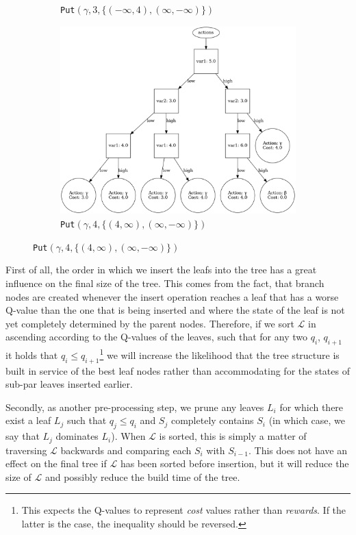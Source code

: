 \documentclass{article}
\begin{document}
\begin{figure}[H]
\begin{subfigure}[t]{0.55\textwidth}
        \captionsetup{labelformat=empty}
        \caption{%
            \texttt{Put}$(\gamma, 3, \{(-\infty, 4),(\infty,-\infty)\})$
        }
    \end{subfigure}
    \begin{subfigure}[t]{0.55\textwidth}
        \centering
        \includegraphics[width=.9\textwidth]{exampleBuild6}
        \captionsetup{labelformat=empty}
        \caption{%
            \texttt{Put}$(\gamma, 4, \{(4, \infty),(\infty,-\infty)\})$
        }
    \end{subfigure}
\end{figure}

First of all, the order in which we insert the leafs into the tree has a great
influence on the final size of the tree. This comes from the fact, that branch
nodes are created whenever the insert operation reaches a leaf that has a worse
Q-value than the one that is being inserted and where the state of the leaf is
not yet completely determined by the parent nodes. Therefore, if we sort
$\mathcal{L}$ in ascending according to the Q-values of the leaves, such that
for any two $q_i$, $q_{i+1}$ it holds that $q_i \leq q_{i+1}$\footnote{%
    This expects the Q-values to represent \textit{cost} values rather than
    \textit{rewards}. If the latter is the case, the inequality should be
    reversed.
} we will increase the likelihood that the tree structure is built in
service of the best leaf nodes rather than accommodating for the states of
sub-par leaves inserted earlier.

Secondly, as another pre-processing step, we prune any leaves $L_i$ for which
there exist a leaf $L_j$ such that $q_j \leq q_i$ and $S_j$ completely contains
$S_i$ (in which case, we say that $L_j$ dominates $L_i$). When $\mathcal{L}$ is
sorted, this is simply a matter of traversing $\mathcal{L}$ backwards and
comparing each $S_{i}$ with $S_{i-1}$. This does not have an effect on the final
tree if $\mathcal{L}$ has been sorted before insertion, but it will reduce the
size of $\mathcal{L}$ and possibly reduce the build time of the tree.
\end{document}

